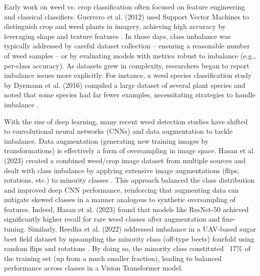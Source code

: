 \documentclass[agriengineering,article,submit,pdftex,moreauthors]{Definitions/mdpi}
\begin{document}
Early work on weed vs. crop classification often focused on feature engineering and classical classifiers. Guerrero et al. (2012) used Support Vector Machines to distinguish crop and weed plants in imagery, achieving high accuracy by leveraging shape and texture features  \cite{Guerrero2012-zi}. In those days, class imbalance was typically addressed by careful dataset collection – ensuring a reasonable number of weed samples – or by evaluating models with metrics robust to imbalance (e.g., per-class accuracy). As datasets grew in complexity, researchers began to report imbalance issues more explicitly. For instance, a weed species classification study by Dyrmann et al. (2016) compiled a large dataset of several plant species and noted that some species had far fewer examples, necessitating strategies to handle imbalance \cite{Dyrmann2016-uh}.
%

With the rise of deep learning, many recent weed detection studies have shifted to convolutional neural networks (CNNs) and data augmentation to tackle imbalance. Data augmentation (generating new training images by transformations) is effectively a form of oversampling in image space. Hasan et al. (2023) created a combined weed/crop image dataset from multiple sources and dealt with class imbalance by applying extensive image augmentations (flips, rotations, etc.) to minority classes \cite{Mahmudul-Hasan2023-ap}. This approach balanced the class distribution and improved deep CNN performance, reinforcing that augmenting data can mitigate skewed classes in a manner analogous to synthetic oversampling of features. Indeed, Hasan et al. (2023) found that models like ResNet-50 achieved significantly higher recall for rare weed classes after augmentation and fine-tuning. Similarly, Reedha et al. (2022) addressed imbalance in a UAV-based sugar beet field dataset by upsampling the minority class (off-type beets) fourfold using random flips and rotations \citeauthor{Reedha2022-fp}. By doing so, the minority class constituted ~17\% of the training set (up from a much smaller fraction), leading to balanced performance across classes in a Vision Transformer model.
\end{document}
